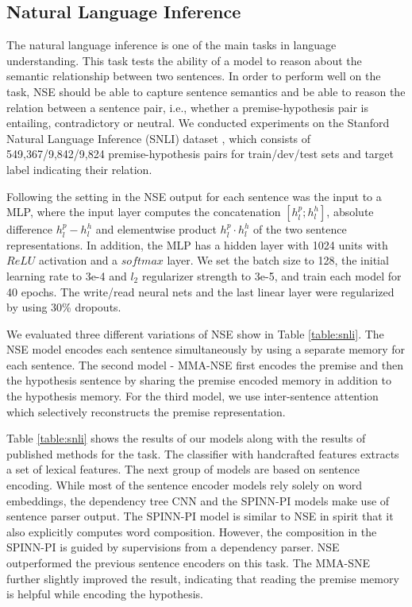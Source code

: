 \documentclass{article}
\begin{document}
\subsection{Natural Language Inference}

The natural language inference is one of the main tasks in language understanding. This task tests the ability of a model to reason about the semantic relationship between two sentences. In order to perform well on the task, NSE should be able to capture sentence semantics and be able to reason the relation between a sentence pair, i.e., whether a premise-hypothesis pair is entailing, contradictory or neutral. We conducted experiments on the Stanford Natural Language Inference (SNLI) dataset \cite{bowman:15}, which consists of 549,367/9,842/9,824 premise-hypothesis pairs for train/dev/test sets and target label indicating their relation. 

Following the setting in \cite{Lili16,BowmanGRGMP16} the NSE output for each sentence was the input to a MLP, where the input layer computes the concatenation $[h^p_l;h^h_l]$, absolute difference $h^p_l-h^h_l$ and elementwise product $h^p_l \cdot h^h_l$ of the two sentence representations. In addition, the MLP has a hidden layer with 1024 units with $ReLU$ activation and a $softmax$ layer. We set the batch size to 128, the initial learning rate to 3e-4 and $l_2$ regularizer strength to 3e-5, and train each model for 40 epochs. The write/read neural nets and the last linear layer were regularized by using 30\% dropouts.

We evaluated three different variations of NSE show in Table \ref{table:snli}. The NSE model encodes each sentence simultaneously by using a separate memory for each sentence. The second model - MMA-NSE first encodes the premise and then the hypothesis sentence by sharing the premise encoded memory in addition to the hypothesis memory. For the third model, we use inter-sentence attention which selectively reconstructs the premise representation.

Table \ref{table:snli} shows the results of our models along with the results of published methods for the task. The classifier with handcrafted features extracts a set of lexical features. The next group of models are based on sentence encoding. While most of the sentence encoder models rely solely on word embeddings, the dependency tree CNN and the SPINN-PI models make use of sentence parser output. The SPINN-PI model is similar to NSE in spirit that it also explicitly computes word composition. However, the composition in the SPINN-PI is guided by supervisions from a dependency parser. NSE outperformed the previous sentence encoders on this task. The MMA-SNE further slightly improved the result, indicating that reading the premise memory is helpful while encoding the hypothesis. 
\end{document}
